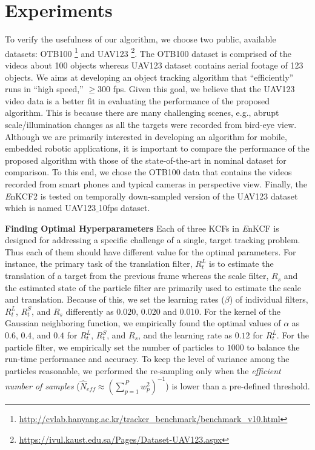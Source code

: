 \documentclass{bmvc2k}
\begin{document}
\section{Experiments} \label{sc:Experiments}
To verify the usefulness of our algorithm, we choose two public,
available datasets:
OTB100 \footnote{\url{http://cvlab.hanyang.ac.kr/tracker_benchmark/benchmark_v10.html}}
and
UAV123 \footnote{\url{https://ivul.kaust.edu.sa/Pages/Dataset-UAV123.aspx}}\cite{mueller2016uav123}.
The OTB100 dataset is comprised of the videos about 100 objects
whereas UAV123 dataset contains aerial footage of 123 objects. We aims
at developing an object tracking algorithm that ``efficiently'' runs
in ``high speed,'' $\ge 300$ fps. Given this goal, we believe that the
UAV123 video data is a better fit in evaluating the performance of the
proposed algorithm. This is because there are many challenging scenes,
e.g., abrupt scale/illumination changes as all the targets were
recorded from bird-eye view. Although we are primarily interested in
developing an algorithm for mobile, embedded robotic applications, it
is important to compare the performance of the proposed algorithm with
those of the state-of-the-art in nominal dataset for comparison. To
this end, we chose the OTB100 data that contains the videos recorded
from smart phones and typical cameras in perspective view. Finally,
the {\it E}nKCF2 is tested on temporally down-sampled version of the
UAV123 dataset which is named UAV123$\_$10fps dataset.

\textbf{Finding Optimal Hyperparameters} Each of three KCFs in {\it
  E}nKCF is designed for addressing a specific challenge of a single,
target tracking problem. Thus each of them should have different value
for the optimal parameters. For instance, the primary task of the
translation filter, $R_{t}^{L}$ is to estimate the translation of a
target from the previous frame whereas the scale filter, $R_{s}$ and
the estimated state of the particle filter are primarily used to
estimate the scale and translation. Because of this, we set the
learning rates ($\beta$) of individual filters, $R_{t}^{L}$,
$R_{t}^{S}$, and $R_{s}$ differently as $0.020$, $0.020$ and
$0.010$. For the kernel of the Gaussian neighboring function, we
empirically found the optimal values of $\alpha$ as $0.6$, $0.4$, and
$0.4$ for $R_{t}^{L}$, $R_{t}^{S}$, and $R_{s}$, and the learning rate
as $0.12$ for $R_{t}^{L}$. For the particle filter, we empirically set
the number of particles to $1000$ to balance the run-time performance
and accuracy. To keep the level of variance among the particles
reasonable, we performed the re-sampling only when the
\textit{efficient number of samples} ($ \hat{N}_{eff} \approx
(\sum_{p=1}^{P}w_{p}^{2})^{-1} $) is lower than a pre-defined
threshold. 
\end{document}
